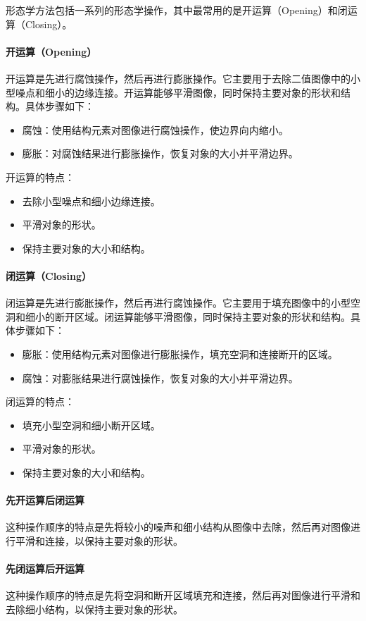 \documentclass[12pt,hyperref,a4paper,UTF8]{ctexart}
\begin{document}
形态学方法包括一系列的形态学操作，其中最常用的是开运算（Opening）和闭运算（Closing）。

\paragraph{开运算（Opening）}
开运算是先进行腐蚀操作，然后再进行膨胀操作。它主要用于去除二值图像中的小型噪点和细小的边缘连接。开运算能够平滑图像，同时保持主要对象的形状和结构。具体步骤如下：
\begin{itemize}
\item 腐蚀：使用结构元素对图像进行腐蚀操作，使边界向内缩小。
\item 膨胀：对腐蚀结果进行膨胀操作，恢复对象的大小并平滑边界。
\end{itemize}

开运算的特点：
\begin{itemize}
\item 去除小型噪点和细小边缘连接。
\item 平滑对象的形状。
\item 保持主要对象的大小和结构。
\end{itemize}


\paragraph{闭运算（Closing）}
闭运算是先进行膨胀操作，然后再进行腐蚀操作。它主要用于填充图像中的小型空洞和细小的断开区域。闭运算能够平滑图像，同时保持主要对象的形状和结构。具体步骤如下：
\begin{itemize}
\item 膨胀：使用结构元素对图像进行膨胀操作，填充空洞和连接断开的区域。
\item 腐蚀：对膨胀结果进行腐蚀操作，恢复对象的大小并平滑边界。
\end{itemize}

闭运算的特点：
\begin{itemize}
\item 填充小型空洞和细小断开区域。
\item 平滑对象的形状。
\item 保持主要对象的大小和结构。
\end{itemize}

\paragraph{先开运算后闭运算}
这种操作顺序的特点是先将较小的噪声和细小结构从图像中去除，然后再对图像进行平滑和连接，以保持主要对象的形状。
\paragraph{先闭运算后开运算}
这种操作顺序的特点是先将空洞和断开区域填充和连接，然后再对图像进行平滑和去除细小结构，以保持主要对象的形状。
\end{document}
